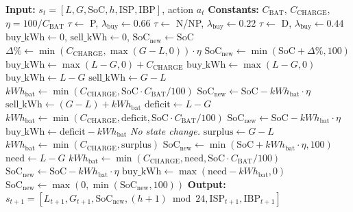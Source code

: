 \documentclass[preprint,12pt]{elsarticle}
\begin{document}
\begin{algorithmic}[1]
\State \textbf{Input:} $s_t = [L, G, \mathrm{SoC}, h, \mathrm{ISP}, \mathrm{IBP}]$, action $a_t$
\State \textbf{Constants:} $C_{\text{BAT}}$, $C_{\text{CHARGE}}$, $\eta = 100/C_{\text{BAT}}$
    \State $\tau \gets$ P, $\lambda_{\text{buy}} \gets 0.66$
    \State $\tau \gets$ N/NP, $\lambda_{\text{buy}} \gets 0.22$
\Else 
    \State $\tau \gets$ D, $\lambda_{\text{buy}} \gets 0.44$
\EndIf
\State $\text{buy\_kWh} \gets 0$, $\text{sell\_kWh} \gets 0$, $\mathrm{SoC}_{\text{new}} \gets \mathrm{SoC}$
        \State $\Delta\% \gets \min(C_{\text{CHARGE}}, \max(G-L,0)) \cdot \eta$
        \State $\mathrm{SoC}_{\text{new}} \gets \min(\mathrm{SoC} + \Delta\%, 100)$
        \State $\text{buy\_kWh} \gets \max(L-G, 0) + C_{\text{CHARGE}}$
    \Else
        \State $\text{buy\_kWh} \gets \max(L-G, 0)$
    \EndIf
{}
        \State $\text{buy\_kWh} \gets L-G$
    \EndIf
{}
            \State $\text{sell\_kWh} \gets G-L$
        \EndIf
    \EndIf
{}
        \State $kWh_{\text{bat}} \gets \min(C_{\text{CHARGE}}, \mathrm{SoC} \cdot C_{\text{BAT}} / 100)$
        \State $\mathrm{SoC}_{\text{new}} \gets \mathrm{SoC} - kWh_{\text{bat}} \cdot \eta$
        \State $\text{sell\_kWh} \gets (G-L) + kWh_{\text{bat}}$
    \EndIf
{}
        \State $\text{deficit} \gets L-G$
        \State $kWh_{\text{bat}} \gets \min(C_{\text{CHARGE}}, \text{deficit}, \mathrm{SoC} \cdot C_{\text{BAT}} / 100)$
        \State $\mathrm{SoC}_{\text{new}} \gets \mathrm{SoC} - kWh_{\text{bat}} \cdot \eta$
        \State $\text{buy\_kWh} \gets \text{deficit} - kWh_{\text{bat}}$
    \EndIf
{}
    \State \textit{No state change.}
        \State $\text{surplus} \gets G-L$
        \State $kWh_{\text{bat}} \gets \min(C_{\text{CHARGE}}, \text{surplus})$
        \State $\mathrm{SoC}_{\text{new}} \gets \min(\mathrm{SoC} + kWh_{\text{bat}} \cdot \eta, 100)$
    \EndIf
{}
        \State $\text{need} \gets L-G$
        \State $kWh_{\text{bat}} \gets \min(C_{\text{CHARGE}}, \text{need}, \mathrm{SoC} \cdot C_{\text{BAT}} / 100)$
        \State $\mathrm{SoC}_{\text{new}} \gets \mathrm{SoC} - kWh_{\text{bat}} \cdot \eta$
        \State $\text{buy\_kWh} \gets \max(\text{need} - kWh_{\text{bat}}, 0)$
    \EndIf
\EndIf
\State $\mathrm{SoC}_{\text{new}} \gets \max(0, \min(\mathrm{SoC}_{\text{new}}, 100))$
\State \textbf{Output:} $s_{t+1} = [L_{t+1}, G_{t+1}, \mathrm{SoC}_{\text{new}}, (h+1) \bmod 24, \mathrm{ISP}_{t+1}, \mathrm{IBP}_{t+1}]$
\end{algorithmic}
\end{document}
